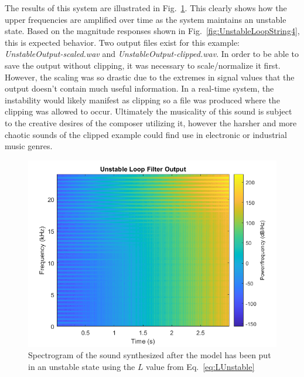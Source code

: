 \documentclass[../main.tex]{subfiles}
\begin{document}
The results of this system are illustrated in Fig.~\ref{fig:UnstableLoop}. This clearly shows how the upper frequencies are amplified over time as the system maintains an unstable state. Based on the magnitude responses shown in Fig.~\ref{fig:UnstableLoopString4}, this is expected behavior. Two output files exist for this example: \emph{UnstableOutput-scaled.wav} and \emph{UnstableOutput-clipped.wav}. In order to be able to save the output without clipping, it was necessary to scale/normalize it first. However, the scaling was so drastic due to the extremes in signal values that the output doesn't contain much useful information. In a real-time system, the instability would likely manifest as clipping so a file was produced where the clipping was allowed to occur. Ultimately the musicality of this sound is subject to the creative desires of the composer utilizing it, however the harsher and more chaotic sounds of the clipped example could find use in electronic or industrial music genres.

\begin{figure}[h]
    \centering
    \includegraphics[scale=.65]{./images/plots/UnstableLoopFilter.png}
    \caption{Spectrogram of the sound synthesized after the model has been put in an unstable state using the $L$ value from Eq.~\ref{eq:LUnstable}}
    \label{fig:UnstableLoop}
\end{figure}
\end{document}
